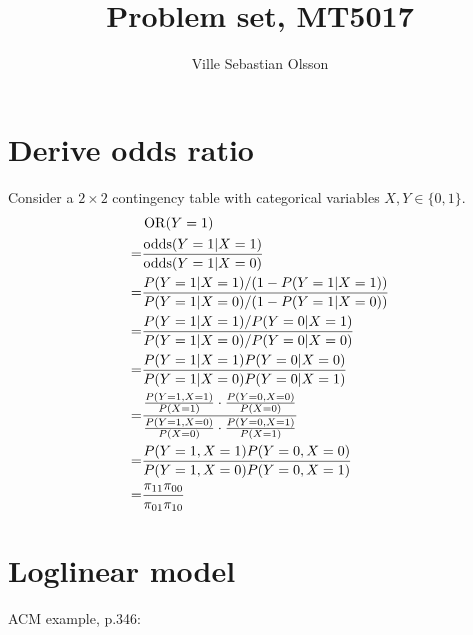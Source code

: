 \documentclass{article}
\title{Problem set, MT5017}
\author{Ville Sebastian Olsson}
\begin{document}
\maketitle
\tableofcontents

\section{Derive odds ratio}
Consider a \(2\times 2\) contingency table with categorical variables \(X,Y\in\{0,1\}\).
\begin{align*}
    & \operatorname{OR}(Y=1) \\
    =& \frac{\operatorname{odds}(Y=1|X=1)}{\operatorname{odds}(Y=1|X=0)} \\
    =& \frac{P(Y=1|X=1)/(1-P(Y=1|X=1))}{P(Y=1|X=0)/(1-P(Y=1|X=0))} \\
    =& \frac{P(Y=1|X=1)/P(Y=0|X=1)}{P(Y=1|X=0)/P(Y=0|X=0)} \\
    =& \frac{P(Y=1|X=1)P(Y=0|X=0)}{P(Y=1|X=0)P(Y=0|X=1)} \\
    =& \frac{\frac{P(Y=1,X=1)}{P(X=1)}\cdot \frac{P(Y=0,X=0)}{P(X=0)}}{\frac{P(Y=1,X=0)}{P(X=0)}\cdot \frac{P(Y=0,X=1)}{P(X=1)}} \\
    =& \frac{P(Y=1,X=1) P(Y=0,X=0)}{P(Y=1,X=0)P(Y=0,X=1)} \\
    =& \frac{\pi_{11} \pi_{00}}{\pi_{01}\pi_{10}} \\
\end{align*}

\section{Loglinear model}

ACM example, p.346:
\end{document}
